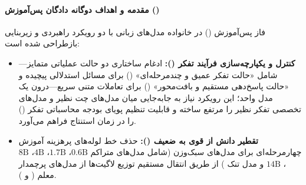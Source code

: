 \item {}

\paragraph*{مقدمه و اهداف دوگانه دادگان پس‌آموزش ()}
فاز پس‌آموزش () در خانواده مدل‌های زبانی  با دو رویکرد راهبردی و زیربنایی بازطراحی شده است:
\begin{itemize}
    \item \textbf{کنترل و یکپارچه‌سازی فرآیند تفکر ():} ادغام ساختاری دو حالت عملیاتی متمایز—شامل «حالت تفکر عمیق و چندمرحله‌ای» () برای مسائل استدلالی پیچیده و «حالت پاسخ‌دهی مستقیم و بافت‌محور» () برای تعاملات متنی سریع—درون یک مدل واحد؛ این رویکرد نیاز به جابه‌جایی میان مدل‌های چت نظیر  و مدل‌های تخصصی تفکر نظیر  \cite{qwen2025qwq} را مرتفع ساخته و قابلیت تنظیم پویای بودجه محاسباتی تفکر () را در زمان استنتاج فراهم می‌آورد.
    \item \textbf{تقطیر دانش از قوی به ضعیف ():} حذف خط لوله‌های پرهزینه آموزش چهارمرحله‌ای برای مدل‌های سبک‌وزن (شامل مدل‌های متراکم $0.6\text{B}$، $1.7\text{B}$، $4\text{B}$، $8\text{B}$، $14\text{B}$ و مدل تنک ) از طریق انتقال مستقیم توزیع لاگیت‌ها از مدل‌های پرچمدار معلم ( و ).
\end{itemize}

